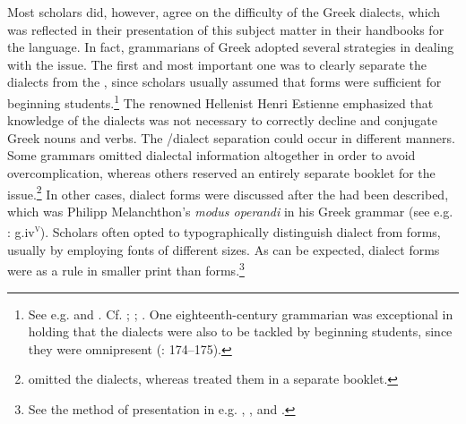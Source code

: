 Most scholars did, however, agree on the difficulty of the Greek dialects, which was reflected in their presentation of this subject matter in their handbooks for the language. In fact, grammarians of Greek adopted several strategies in dealing with the issue. The first and most important one was to clearly separate the dialects from the , since scholars usually assumed that  forms were sufficient for beginning students.\footnote{See e.g.  and \citet[223]{Tavoni1986}. Cf. \citet[aa.ii\textsc{\textsuperscript{v}}]{Glarean1524}; \citet[\textsc{a}.ii\textsc{\textsuperscript{v}}]{Metzler1529}; \citet[105]{Rollin1726}. One eighteenth-century  grammarian was exceptional in holding that the dialects were also to be tackled by beginning students, since they were omnipresent (\citealt{Trendelenburg1782}: 174–175).} The renowned  Hellenist Henri Estienne emphasized that knowledge of the dialects was not necessary to correctly decline and conjugate Greek nouns and verbs. The /dialect separation could occur in different manners. Some grammars omitted dialectal information altogether in order to avoid overcomplication, whereas others reserved an entirely separate booklet for the issue.\footnote{\citet[\textsc{b.}iv\textsc{\textsuperscript{r}}]{Caselius1560} omitted the dialects, whereas \citet[†.6\textsc{\textsuperscript{v}}–†.7\textsc{\textsuperscript{r}}]{Walper1589} treated them in a separate booklet.} In other cases, dialect forms were discussed after the  had been described, which was Philipp Melanchthon’s \textit{modus operandi} in his Greek grammar (see e.g. \citealt{Melanchthon1518}: g.iv\textsc{\textsuperscript{v}}). Scholars often opted to typographically distinguish dialect from  forms, usually by employing fonts of different sizes. As can be expected, dialect forms were as a rule in smaller print than  forms.\footnote{See the method of presentation in e.g. \citet{Gretser1593}, \citet{Anon.1613}, and \citet{Lancelot1655}.}

